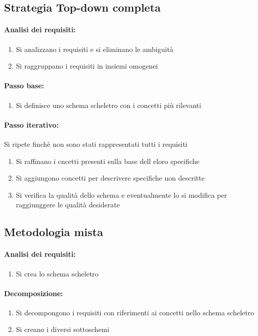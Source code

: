 \documentclass[12pt, a4paper, openany, twoside]{book}
\begin{document}
\subsection{Strategia Top-down completa}
\paragraph{Analisi dei requisiti:}
\begin{enumerate}
	\item Si analizzano i requisiti e si eliminano le ambiguità
	\item Si raggruppano i requisiti in insiemi omogenei
\end{enumerate}
\paragraph{Passo base:}
\begin{enumerate}
	\item Si definisce uno schema scheletro con i concetti più rilevanti
\end{enumerate}
\paragraph{Passo iterativo:} Si ripete finchè non sono stati rappresentati tutti
i requisiti
\begin{enumerate}
	\item Si raffinano i cncetti presenti sulla base dell eloro specifiche
	\item Si aggiungono concetti per descrivere specifiche non descritte
	\item Si verifica la qualità dello schema e eventualmente lo si modifica per 
	raggiunggere le qualità desiderate
\end{enumerate}
\subsection{Metodologia mista}
\paragraph{Analisi dei requisiti:}
\begin{enumerate}
	\item Si crea lo schema scheletro
\end{enumerate}
\paragraph{Decomposizione:}
\begin{enumerate}
	\item Si decompongono i requisiti con riferimenti ai concetti nello schema 
	scheletro
	\item Si creano i diversi sottoschemi
\end{enumerate}
\end{document}
